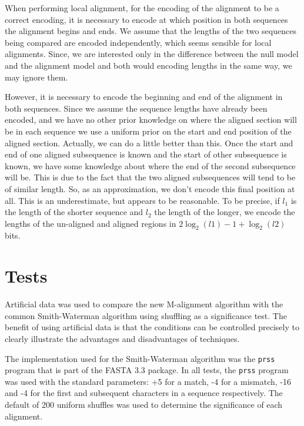 \documentclass[letterpaper,11pt,oneside]{article}
\begin{document}
When performing local alignment, for the encoding of the alignment to be a
correct encoding, it is necessary to encode at which position in both
sequences the alignment begins and ends.  We assume that the lengths of the
two sequences being compared are encoded independently, which seems sensible
for local alignments.  Since, we are interested only in the difference between
the null model and the alignment model and both would encoding lengths in the
same way, we may ignore them.

However, it is necessary to encode the beginning and end of the alignment in
both sequences.  Since we assume the sequence lengths have already been
encoded, and we have no other prior knowledge on where the aligned section
will be in each sequence we use a uniform prior on the start and end position
of the aligned section.  Actually, we can do a little better than this.  Once
the start and end of one aligned subsequence is known and the start of other
subsequence is known, we have some knowledge about where the end of the second
subsequence will be.  This is due to the fact that the two aligned
subsequences will tend to be of similar length.  So, as an approximation, we
don't encode this final position at all.  This is an underestimate, but
appears to be reasonable.  To be precise, if $l_1$ is the length of the
shorter sequence and $l_2$ the length of the longer, we encode the lengths of
the un-aligned and aligned regions in $2\log_2(l1) - 1 + \log_2(l2)$ bits.



\section{Tests}

Artificial data was used to compare the new M-alignment algorithm with the
common Smith-Waterman algorithm using shuffling as a significance test.  The
benefit of using artificial data is that the conditions can be controlled
precisely to clearly illustrate the advantages and disadvantages of
techniques.

The implementation used for the Smith-Waterman algorithm was the \verb!prss!
program that is part of the FASTA 3.3 package.  In all tests, the \verb!prss!
program was used with the standard parameters: +5 for a match, -4 for a
mismatch, -16 and -4 for the first and subsequent characters in a sequence
respectively.  The default of 200 uniform shuffles was used to determine the
significance of each alignment.
\end{document}

